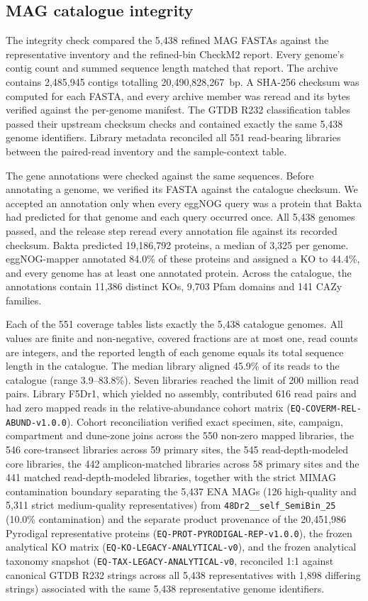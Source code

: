 \begin{revision}
\subsection{MAG catalogue integrity}

The integrity check compared the 5,438 refined MAG FASTAs against the representative inventory
and the refined-bin CheckM2 report. Every genome's contig count and summed
sequence length matched that report. The archive contains 2,485,945 contigs
totalling 20,490,828,267~bp. A SHA-256 checksum was computed for each FASTA,
and every archive member was reread and its bytes verified against the
per-genome manifest. The GTDB R232 classification tables passed their
upstream checksum checks and contained exactly the same 5,438 genome
identifiers. Library metadata reconciled all 551 read-bearing libraries
between the paired-read inventory and the sample-context table.

The gene annotations were checked against the same sequences. Before
annotating a genome, we verified its FASTA against the catalogue checksum.
We accepted an annotation only when every eggNOG query was a protein that
Bakta had predicted for that genome and each query occurred once. All
5,438 genomes passed, and the release step reread every annotation file
against its recorded checksum. Bakta predicted 19,186,792 proteins, a
median of 3,325 per genome. eggNOG-mapper annotated 84.0\% of these
proteins and assigned a KO to 44.4\%, and every genome has at least one
annotated protein. Across the catalogue, the annotations contain 11,386
distinct KOs, 9,703 Pfam domains and 141 CAZy families.

Each of the 551 coverage tables lists exactly the 5,438 catalogue genomes.
All values are finite and non-negative, covered fractions are at most one,
read counts are integers, and the reported length of each genome equals its
total sequence length in the catalogue. The median library aligned 45.9\%
of its reads to the catalogue (range 3.9--83.8\%). Seven libraries reached
the limit of 200 million read pairs. Library F5Dr1, which yielded no
assembly, contributed 616 read pairs and had zero mapped reads in the
relative-abundance cohort matrix (\texttt{EQ-COVERM-REL-ABUND-v1.0.0}).
Cohort reconciliation verified exact specimen, site, campaign, compartment
and dune-zone joins across the 550 non-zero mapped libraries, the 546
core-transect libraries across 59 primary sites, the 545 read-depth-modeled
core libraries, the 442 amplicon-matched libraries across 58 primary sites
and the 441 matched read-depth-modeled libraries, together with the strict
MIMAG contamination boundary separating the 5,437 ENA MAGs (126 high-quality
and 5,311 strict medium-quality representatives) from
\texttt{48Dr2\_\_self\_SemiBin\_25} (10.0\% contamination) and the separate
product provenance of the 20,451,986 Pyrodigal representative proteins
(\texttt{EQ-PROT-PYRODIGAL-REP-v1.0.0}), the frozen analytical KO matrix
(\texttt{EQ-KO-LEGACY-ANALYTICAL-v0}), and the frozen analytical taxonomy
snapshot (\texttt{EQ-TAX-LEGACY-ANALYTICAL-v0}, reconciled 1:1 against
canonical GTDB R232 strings across all 5,438 representatives with 1,898
differing strings) associated with the same 5,438
representative genome identifiers.


\end{revision}
